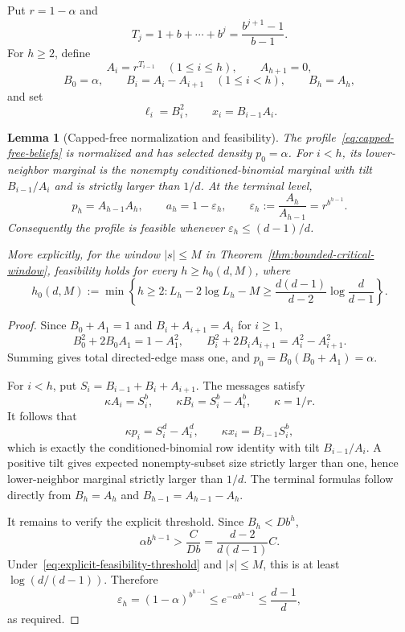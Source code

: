 \documentclass[11pt]{amsart}
\newtheorem{lemma}[theorem]{Lemma}
\theoremstyle{definition}
\begin{document}
Put $r=1-\alpha$ and
\[
 T_j=1+b+\cdots+b^j=\frac{b^{j+1}-1}{b-1}.
\]
For $h\ge2$, define
\begin{equation}\label{eq:capped-free-messages}
 A_i=r^{T_{i-1}}\quad(1\le i\le h),
 \qquad A_{h+1}=0,
\end{equation}
\begin{equation}\label{eq:capped-free-B}
 B_0=\alpha,
 \qquad B_i=A_i-A_{i+1}\quad(1\le i<h),
 \qquad B_h=A_h,
\end{equation}
and set
\begin{equation}\label{eq:capped-free-beliefs}
 \ell_i=B_i^2,
 \qquad
 x_i=B_{i-1}A_i.
\end{equation}

\begin{lemma}[Capped-free normalization and feasibility]\label{lem:capped-free-feasible}
The profile~\eqref{eq:capped-free-beliefs} is normalized and has selected density $p_0=\alpha$.  For $i<h$, its lower-neighbor marginal is the nonempty conditioned-binomial marginal with tilt $B_{i-1}/A_i$ and is strictly larger than $1/d$.  At the terminal level,
\begin{equation}\label{eq:capped-terminal}
 p_h=A_{h-1}A_h,
 \qquad
 a_h=1-\varepsilon_h,
 \qquad
 \varepsilon_h:=\frac{A_h}{A_{h-1}}=r^{b^{h-1}}.
\end{equation}
Consequently the profile is feasible whenever
$\varepsilon_h\le(d-1)/d$.

More explicitly, for the window $|s|\le M$ in
Theorem~\ref{thm:bounded-critical-window}, feasibility holds for every
$h\ge h_0(d,M)$, where
\begin{equation}\label{eq:explicit-feasibility-threshold}
 h_0(d,M):=\min\left\{h\ge2:
 L_h-2\log L_h-M
 \ge \frac{d(d-1)}{d-2}\log\frac d{d-1}
 \right\}.
\end{equation}
\end{lemma}

\begin{proof}
Since $B_0+A_1=1$ and $B_i+A_{i+1}=A_i$ for $i\ge1$,
\[
 B_0^2+2B_0A_1=1-A_1^2,
 \qquad
 B_i^2+2B_iA_{i+1}=A_i^2-A_{i+1}^2.
\]
Summing gives total directed-edge mass one, and
$p_0=B_0(B_0+A_1)=\alpha$.

For $i<h$, put $S_i=B_{i-1}+B_i+A_{i+1}$.  The messages satisfy
\[
 \kappa A_i=S_i^b,
 \qquad
 \kappa B_i=S_i^b-A_i^b,
 \qquad
 \kappa=1/r.
\]
It follows that
\[
 \kappa p_i=S_i^d-A_i^d,
 \qquad
 \kappa x_i=B_{i-1}S_i^b,
\]
which is exactly the conditioned-binomial row identity with tilt
$B_{i-1}/A_i$.  A positive tilt gives expected nonempty-subset size strictly larger than one, hence lower-neighbor marginal strictly larger than $1/d$.  The terminal formulas follow directly from
$B_h=A_h$ and $B_{h-1}=A_{h-1}-A_h$.

It remains to verify the explicit threshold.  Since
$B_h<Db^h$,
\[
 \alpha b^{h-1}
 >\frac{C}{Db}
 =\frac{d-2}{d(d-1)}C.
\]
Under~\eqref{eq:explicit-feasibility-threshold} and $|s|\le M$, this is at least $\log(d/(d-1))$.  Therefore
\[
 \varepsilon_h=(1-\alpha)^{b^{h-1}}
 \le e^{-\alpha b^{h-1}}
 \le\frac{d-1}{d},
\]
as required.
\end{proof}
\end{document}
